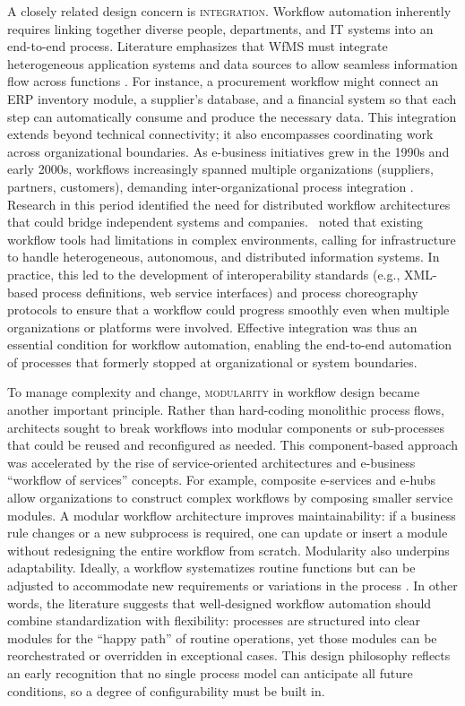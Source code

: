 A closely related design concern is \textsc{integration}. Workflow automation inherently requires linking together diverse people, departments, and IT systems into an end-to-end process. Literature emphasizes that WfMS must integrate heterogeneous application systems and data sources to allow seamless information flow across functions \parencite{stohrWorkflow2001}. For instance, a procurement workflow might connect an ERP inventory module, a supplier's database, and a financial system so that each step can automatically consume and produce the necessary data. This integration extends beyond technical connectivity; it also encompasses coordinating work across organizational boundaries. As e-business initiatives grew in the 1990s and early 2000s, workflows increasingly spanned multiple organizations (suppliers, partners, customers), demanding inter-organizational process integration \parencite{basuResearch2002}. Research in this period identified the need for distributed workflow architectures that could bridge independent systems and companies.~\textcite{georgakopoulosOverview1995} noted that existing workflow tools had limitations in complex environments, calling for infrastructure to handle heterogeneous, autonomous, and distributed information systems. In practice, this led to the development of interoperability standards (e.g., XML-based process definitions, web service interfaces) and process choreography protocols to ensure that a workflow could progress smoothly even when multiple organizations or platforms were involved. Effective integration was thus an essential condition for workflow automation, enabling the end-to-end automation of processes that formerly stopped at organizational or system boundaries.

To manage complexity and change, \textsc{modularity} in workflow design became another important principle. Rather than hard-coding monolithic process flows, architects sought to break workflows into modular components or sub-processes that could be reused and reconfigured as needed. This component-based approach was accelerated by the rise of service-oriented architectures and e-business \enquote{workflow of services} concepts. For example, composite e-services and e-hubs allow organizations to construct complex workflows by composing smaller service modules. A modular workflow architecture improves maintainability: if a business rule changes or a new subprocess is required, one can update or insert a module without redesigning the entire workflow from scratch. Modularity also underpins adaptability. Ideally, a workflow systematizes routine functions but can be adjusted to accommodate new requirements or variations in the process \parencite{basuResearch2002}. In other words, the literature suggests that well-designed workflow automation should combine standardization with flexibility: processes are structured into clear modules for the \enquote{happy path} of routine operations, yet those modules can be reorchestrated or overridden in exceptional cases. This design philosophy reflects an early recognition that no single process model can anticipate all future conditions, so a degree of configurability must be built in.

